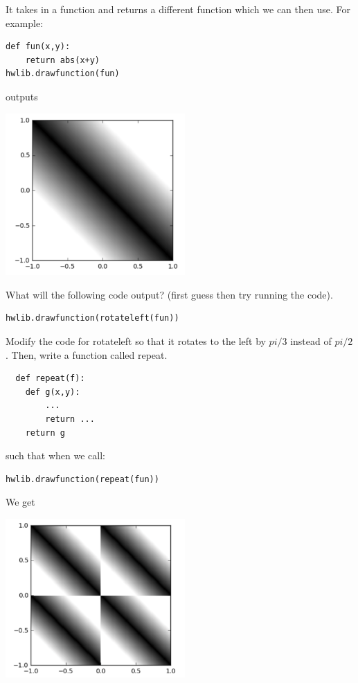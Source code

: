 \documentclass[letterpaper,11pt]{amsart}
\theoremstyle{plain}
\theoremstyle{definition}
\begin{document}
It takes in a function and returns a different function which we can then use. For example:

\begin{lstlisting}
def fun(x,y):
    return abs(x+y)
hwlib.drawfunction(fun)
\end{lstlisting}
outputs

\noindent\includegraphics[width=2.7in]{imgorig.png}

What will the following code output? (first guess then try running the code). 

\begin{lstlisting}
hwlib.drawfunction(rotateleft(fun))
\end{lstlisting}

Modify the code for rotateleft so that it rotates to the left by $pi/3$ instead of $pi/2$. 
Then, write a function called repeat. 

\begin{lstlisting}
  def repeat(f):
    def g(x,y):
        ...  
        return ...  
    return g
\end{lstlisting}

such that when we call:

\begin{lstlisting}
hwlib.drawfunction(repeat(fun))
\end{lstlisting}
We get

\noindent\includegraphics[width=2.7in]{imgrepeat.png}
\end{document}

